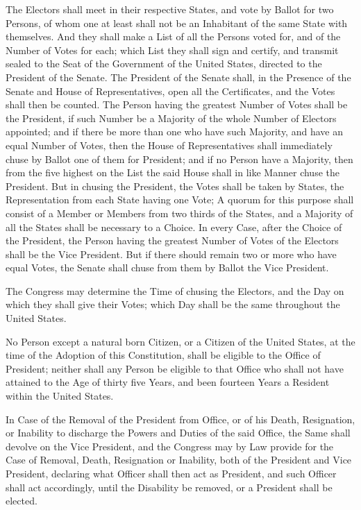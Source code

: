 The Electors shall meet in their respective States, and vote by Ballot for two Persons, of whom one at least shall not be an Inhabitant of the same State with themselves. And they shall make a List of all the Persons voted for, and of the Number of Votes for each; which List they shall sign and certify, and transmit sealed to the Seat of the Government of the United States, directed to the President of the Senate. The President of the Senate shall, in the Presence of the Senate and House of Representatives, open all the Certificates, and the Votes shall then be counted. The Person having the greatest Number of Votes shall be the President, if such Number be a Majority of the whole Number of Electors appointed; and if there be more than one who have such Majority, and have an equal Number of Votes, then the House of Representatives shall immediately chuse by Ballot one of them for President; and if no Person have a Majority, then from the five highest on the List the said House shall in like Manner chuse the President. But in chusing the President, the Votes shall be taken by States, the Representation from each State having one Vote; A quorum for this purpose shall consist of a Member or Members from two thirds of the States, and a Majority of all the States shall be necessary to a Choice. In every Case, after the Choice of the President, the Person having the greatest Number of Votes of the Electors shall be the Vice President. But if there should remain two or more who have equal Votes, the Senate shall chuse from them by Ballot the Vice President.

The Congress may determine the Time of chusing the Electors, and the Day on which they shall give their Votes; which Day shall be the same throughout the United States.

No Person except a natural born Citizen, or a Citizen of the United States, at the time of the Adoption of this Constitution, shall be eligible to the Office of President; neither shall any Person be eligible to that Office who shall not have attained to the Age of thirty five Years, and been fourteen Years a Resident within the United States.

In Case of the Removal of the President from Office, or of his Death, Resignation, or Inability to discharge the Powers and Duties of the said Office, the Same shall devolve on the Vice President, and the Congress may by Law provide for the Case of Removal, Death, Resignation or Inability, both of the President and Vice President, declaring what Officer shall then act as President, and such Officer shall act accordingly, until the Disability be removed, or a President shall be elected.


